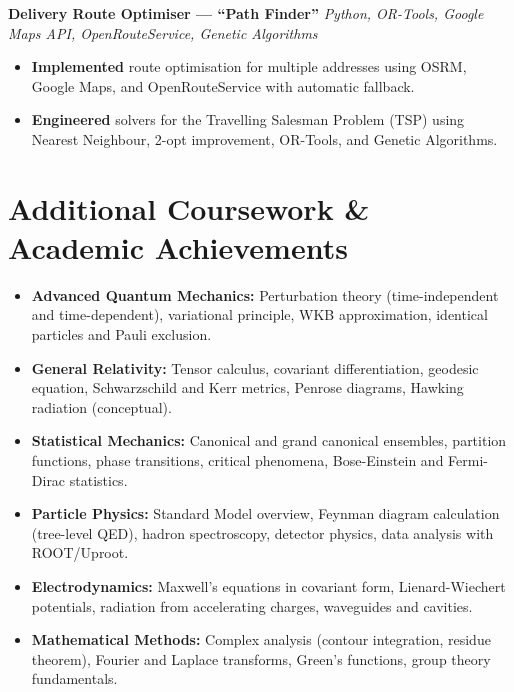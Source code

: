 \documentclass[10pt, a4paper]{article}
\newenvironment{project}[2]{%
  \textbf{\color{accent}#1} \hfill
  \small\textit{\color{light}#2}%
  \begin{itemize}%
}{%
  \end{itemize}%
  \vspace{2pt}%
}
\begin{document}
\begin{project}{Delivery Route Optimiser --- ``Path Finder''}{Python, OR-Tools, Google Maps API, OpenRouteService, Genetic Algorithms}
  \item \textbf{Implemented} route optimisation for multiple addresses using OSRM, Google Maps, and OpenRouteService with automatic fallback.
  \item \textbf{Engineered} solvers for the Travelling Salesman Problem (TSP) using Nearest Neighbour, 2-opt improvement, OR-Tools, and Genetic Algorithms.
\end{project}

\section{Additional Coursework \& Academic Achievements}

\begin{itemize}
  \item \textbf{Advanced Quantum Mechanics:} Perturbation theory (time-independent and time-dependent),
        variational principle, WKB approximation, identical particles and Pauli exclusion.
  \item \textbf{General Relativity:} Tensor calculus, covariant differentiation, geodesic equation,
        Schwarzschild and Kerr metrics, Penrose diagrams, Hawking radiation (conceptual).
  \item \textbf{Statistical Mechanics:} Canonical and grand canonical ensembles, partition functions,
        phase transitions, critical phenomena, Bose-Einstein and Fermi-Dirac statistics.
  \item \textbf{Particle Physics:} Standard Model overview, Feynman diagram calculation (tree-level QED),
        hadron spectroscopy, detector physics, data analysis with ROOT/Uproot.
  \item \textbf{Electrodynamics:} Maxwell's equations in covariant form, Lienard-Wiechert potentials,
        radiation from accelerating charges, waveguides and cavities.
  \item \textbf{Mathematical Methods:} Complex analysis (contour integration, residue theorem),
        Fourier and Laplace transforms, Green's functions, group theory fundamentals.
\end{itemize}

\end{document}
